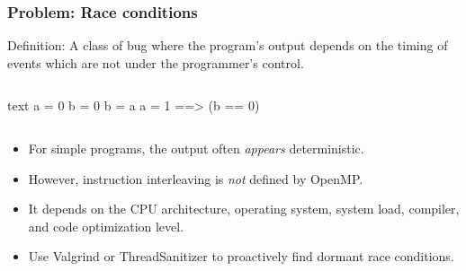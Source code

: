 \documentclass[handout]{beamer}
\begin{document}
\begin{frame}[fragile]
  \frametitle{Problem: Race conditions}
  Definition: A class of bug where the program's output depends on the timing of events which are not under the programmer's control.  
  \begin{columns}[t]%
    \begin{column}{0.5\textwidth}
      \begin{ccode}[]
        {text}
        a = 0
        b = 0
        b = a
        a = 1
          ==> (b == 0)\end{ccode}
    \end{column}
  \end{columns}
  \pause
  \begin{itemize}
  \item For simple programs, the output often \emph{appears} deterministic.
  \item However, instruction interleaving is \emph{not} defined by OpenMP.
  \item It depends on the CPU architecture, operating system, system load, compiler, and code optimization level.
  \item Use Valgrind or ThreadSanitizer to proactively find dormant race conditions.
  \end{itemize}

\end{frame}
\end{document}

